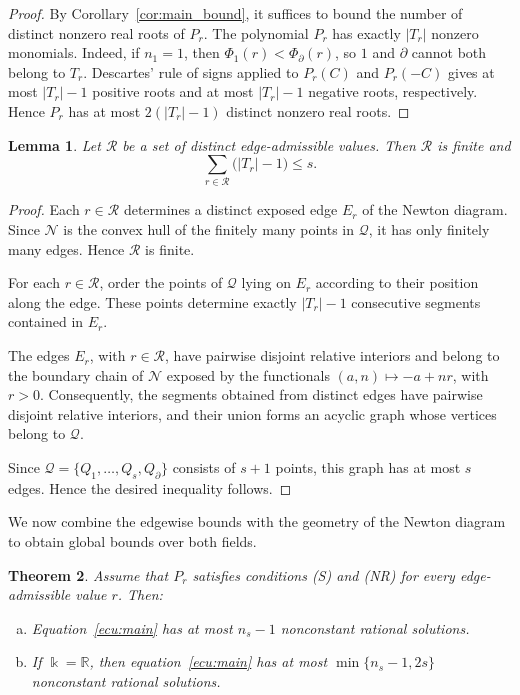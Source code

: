 \documentclass[12pt,a4paper]{amsart}
\newtheorem{theorem}{Theorem}
\numberwithin{theorem}{section}
\newtheorem{lemma}[theorem]{Lemma}
\theoremstyle{definition}
\begin{document}
	\begin{proof} 
		By Corollary~\ref{cor:main_bound}, it suffices to bound the number of distinct nonzero real roots of $P_r$. The polynomial $P_r$ has exactly $|T_r|$ nonzero monomials. Indeed, if $n_1=1$, then $\Phi_1(r)<\Phi_\partial(r)$, so $1$ and $\partial$ cannot both belong to $T_r$. Descartes' rule of signs applied to $P_r(C)$ and $P_r(-C)$ gives at most $|T_r|-1$ positive roots and at most $|T_r|-1$ negative roots, respectively. Hence $P_r$ has at most $2(|T_r|-1)$ distinct nonzero real roots. 
	\end{proof}
	
	\begin{lemma}\label{lem:edge-cardinality-sum}
		Let $\mathcal R$ be a set of distinct edge-admissible values. Then $\mathcal R$ is finite and
		\[
		\sum_{r\in\mathcal R}\bigl(|T_r|-1\bigr)\leq s.
		\]
	\end{lemma}
	
	\begin{proof}
		Each $r\in\mathcal R$ determines a distinct exposed edge $E_r$ of the Newton diagram. Since $\mathcal N$ is the convex hull of the finitely many points in $\mathcal Q$, it has only finitely many edges. Hence $\mathcal R$ is finite.
		
		For each $r\in\mathcal R$, order the points of $\mathcal Q$ lying on $E_r$ according to their position along the edge. These points determine exactly $|T_r|-1$ consecutive segments contained in $E_r$.
		
		The edges $E_r$, with $r\in\mathcal R$, have pairwise disjoint relative interiors and belong to the boundary chain of $\mathcal N$ exposed by the functionals $(a,n)\mapsto-a+nr$, with $r>0$. Consequently, the segments obtained from distinct edges have pairwise disjoint relative interiors, and their union forms an acyclic graph whose vertices belong to $\mathcal Q$.
		
		Since $\mathcal Q=\{Q_1,\ldots,Q_s,Q_\partial\}$ consists of $s+1$ points, this graph has at most $s$ edges. Hence the desired inequality follows.
	\end{proof}
	
	We now combine the edgewise bounds with the geometry of the Newton diagram to obtain global bounds over both fields.
	
	\begin{theorem}\label{thm:global-bound}
		Assume that $P_r$ satisfies conditions {\rm (S)} and {\rm (NR)} for every edge-admissible value $r$. Then:
		\begin{enumerate}[(a)]
			\item Equation~\eqref{ecu:main} has at most $n_s-1$ nonconstant rational solutions.
			\item If $\Bbbk=\mathbb{R}$, then equation~\eqref{ecu:main} has at most $\min\{n_s-1,2s\}$ nonconstant rational solutions.
		\end{enumerate}
	\end{theorem}
	
\end{document}

